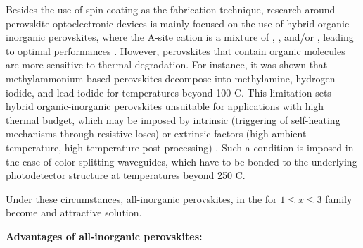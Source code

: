 Besides the use of spin-coating as the fabrication technique, research around perovskite optoelectronic devices is mainly focused on the use of hybrid organic-inorganic perovskites, where the A-site cation is a mixture of , , and/or , leading to optimal performances \cite{Zhang2021All-inorganicCells}. However, perovskites that contain organic molecules are more sensitive to thermal degradation. For instance, it was shown that methylammonium-based perovskites decompose into methylamine, hydrogen iodide, and lead iodide for temperatures beyond 100 \degree C. This limitation sets hybrid organic-inorganic perovskites unsuitable for applications with high thermal budget, which may be imposed by intrinsic (triggering of self-heating mechanisms through resistive loses) or extrinsic factors (high ambient temperature, high temperature post processing) \cite{Handa2019LargePerovskite, Dong2021SupportingFilm, Li2022StructureTemperatures}. Such a condition is imposed in the case of color-splitting waveguides, which have to be bonded to the underlying photodetector structure at temperatures beyond 250 \degree C. 

Under these circumstances, all-inorganic perovskites, in the  for $1 \le x \le 3 $ family become and attractive solution. 

\textbf{Advantages of all-inorganic perovskites: }

